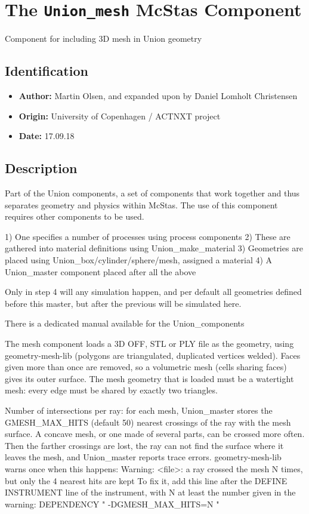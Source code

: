 \section{The \texttt{Union\_mesh} McStas Component}
Component for including 3D mesh in Union geometry

\subsection*{Identification}
\begin{itemize}
  \item \textbf{Author:} Martin Olsen, and expanded upon by Daniel Lomholt Christensen
  \item \textbf{Origin:} University of Copenhagen / ACTNXT project
  \item \textbf{Date:} 17.09.18
\end{itemize}

\subsection*{Description}
Part of the Union components, a set of components that work together and thus separates geometry and physics within McStas. The use of this component requires other components to be used.

1) One specifies a number of processes using process components 2) These are gathered into material definitions using Union\_make\_material 3) Geometries are placed using Union\_box/cylinder/sphere/mesh, assigned a material 4) A Union\_master component placed after all the above

Only in step 4 will any simulation happen, and per default all geometries defined before this master, but after the previous will be simulated here.

There is a dedicated manual available for the Union\_components

The mesh component loads a 3D OFF, STL or PLY file as the geometry, using geometry-mesh-lib (polygons are triangulated, duplicated vertices welded). Faces given more than once are removed, so a volumetric mesh (cells sharing faces) gives its outer surface. The mesh geometry that is loaded must be a watertight mesh: every edge must be shared by exactly two triangles.

Number of intersections per ray: for each mesh, Union\_master stores the GMESH\_MAX\_HITS (default 50) nearest crossings of the ray with the mesh surface. A concave mesh, or one made of several parts, can be crossed more often. Then the farther crossings are lost, the ray can not find the surface where it leaves the mesh, and Union\_master reports trace errors. geometry-mesh-lib warns once when this happens: Warning: \textless{}file\textgreater{}: a ray crossed the mesh N times, but only the 4 nearest hits are kept To fix it, add this line after the DEFINE INSTRUMENT line of the instrument, with N at least the number given in the warning: DEPENDENCY " -DGMESH\_MAX\_HITS=N "

